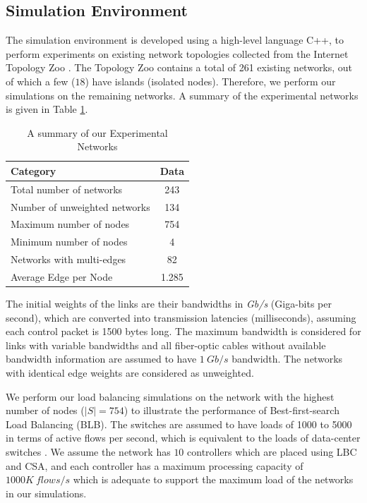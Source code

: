 \documentclass[preprint,12pt]{elsarticle}
\begin{document}
	\subsection{Simulation Environment} \label{SimEnv}
	The simulation environment is developed using a high-level language C++, to perform experiments on existing network topologies collected from the Internet Topology Zoo \cite{knight2011internet}. The Topology Zoo contains a total of 261 existing networks, out of which a few ($18$) have islands (isolated nodes). Therefore, we perform our simulations on the remaining networks. A summary of the experimental networks is given in Table \ref{tab:zooSummary}.
	\begin{table}
		\centering
		\caption{A summary of our Experimental Networks} \label{tab:zooSummary}
		\begin{tabular}{|l|c|}
			\hline
			\textbf{Category} & \textbf{Data} \\
			\hline
			Total number of networks & 243 \\
			\hline
			Number of unweighted networks & 134 \\
			\hline
			Maximum number of nodes & 754 \\
			\hline
			Minimum number of nodes & 4 \\
			\hline
			Networks with multi-edges & 82\\
			\hline
			Average Edge per Node & 1.285 \\
			\hline
		\end{tabular}
	\end{table}

	The initial weights of the links are their bandwidths in \textit{Gb/s} (Giga-bits per second), which are converted into transmission latencies (milliseconds), assuming each control packet is 1500 bytes long. The maximum bandwidth is considered for links with variable bandwidths and all fiber-optic cables without available bandwidth information are assumed to have $1~Gb/s$ bandwidth. The networks with identical edge weights are considered as unweighted.
	
	We perform our load balancing simulations on the network with the highest number of nodes ($|S|=754$) to illustrate the performance of Best-first-search Load Balancing (BLB). The switches are assumed to have loads of 1000 to 5000 in terms of active flows per second, which is equivalent to the loads of data-center switches \cite{benson2010network}. We assume the network has $10$ controllers which are placed using LBC and CSA, and each controller has a maximum processing capacity of $1000K~flows/s$ which is adequate to support the maximum load of the networks in our simulations.
	
\end{document}
